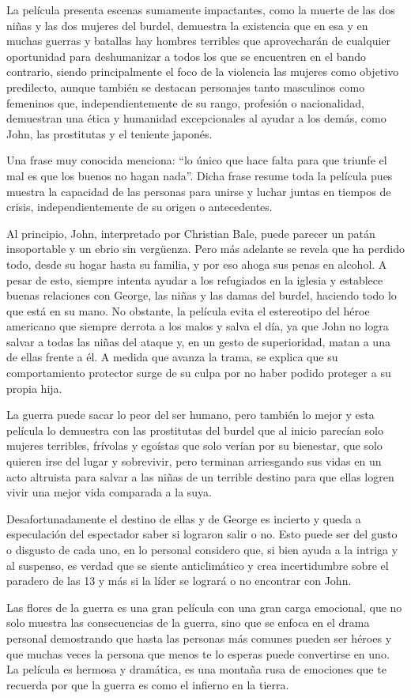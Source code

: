 \documentclass[letterpaper, 12pt]{report}
\begin{document}
La película presenta escenas sumamente impactantes, como la
muerte de las dos niñas y las dos mujeres del burdel,
demuestra la existencia que en esa y en muchas guerras y
batallas hay hombres terribles que aprovecharán de
cualquier oportunidad para deshumanizar a todos los que se
encuentren en el bando contrario, siendo principalmente el
foco de la violencia las mujeres como objetivo predilecto,
aunque también se destacan personajes tanto masculinos como
femeninos que, independientemente de su rango, profesión o
nacionalidad, demuestran una ética y humanidad
excepcionales al ayudar a los demás, como John, las
prostitutas y el teniente japonés.

Una frase muy conocida menciona: “lo único que hace falta
para que triunfe el mal es que los buenos no hagan nada”.
Dicha frase resume toda la película pues muestra la
capacidad de las personas para unirse y luchar juntas en
tiempos de crisis, independientemente de su origen o
antecedentes.

Al principio, John, interpretado por Christian Bale, puede
parecer un patán insoportable y un ebrio sin vergüenza.
Pero más adelante se revela que ha perdido todo, desde su
hogar hasta su familia, y por eso ahoga sus penas en
alcohol. A pesar de esto, siempre intenta ayudar a los
refugiados en la iglesia y establece buenas relaciones con
George, las niñas y las damas del burdel, haciendo todo lo
que está en su mano. No obstante, la película evita el
estereotipo del héroe americano que siempre derrota a los
malos y salva el día, ya que John no logra salvar a todas
las niñas del ataque y, en un gesto de superioridad, matan
a una de ellas frente a él. A medida que avanza la trama,
se explica que su comportamiento protector surge de su
culpa por no haber podido proteger a su propia hija.

La guerra puede sacar lo peor del ser humano, pero también
lo mejor y esta película lo demuestra con las prostitutas
del burdel que al inicio parecían solo mujeres terribles,
frívolas y egoístas que solo verían por su bienestar, que
solo quieren irse del lugar y sobrevivir, pero terminan
arriesgando sus vidas en un acto altruista para salvar a
las niñas de un terrible destino para que ellas logren
vivir una mejor vida comparada a la suya.

Desafortunadamente el destino de ellas y de George es
incierto y queda a especulación del espectador saber si
lograron salir o no. Esto puede ser del gusto o disgusto de
cada uno, en lo personal considero que, si bien ayuda a la
intriga y al suspenso, es verdad que se siente
anticlimático y crea incertidumbre sobre el paradero de las
13 y más si la líder se logrará o no encontrar con John.

Las flores de la guerra es una gran película con una gran
carga emocional, que no solo muestra las consecuencias de
la guerra, sino que se enfoca en el drama personal
demostrando que hasta las personas más comunes pueden ser
héroes y que muchas veces la persona que menos te lo
esperas puede convertirse en uno. La película es hermosa y
dramática, es una montaña rusa de emociones que te recuerda
por que la guerra es como el infierno en la tierra.

\newpage

\printbibliography
\end{document}
